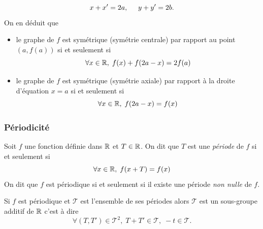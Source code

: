 \begin{displaymath}
 x + x' = 2a, \hspace{0.5cm} y + y' = 2b.
\end{displaymath}
On en déduit que 
\begin{itemize}
 \item le graphe de $f$ est symétrique (symétrie centrale) par rapport au point $(a,f(a))$ si et seulement si 
\begin{displaymath}
\forall x \in \mathbb{R}, \; f(x) + f(2a-x) = 2f(a) 
\end{displaymath}
 \item le graphe de $f$ est symétrique (symétrie axiale) par rapport à la droite d'équation $x = a$ si et seulement si 
\begin{displaymath}
\forall x \in \mathbb{R}, \; f(2a-x) = f(x) 
\end{displaymath}
\end{itemize}

\subsubsection{Périodicité}
\begin{defi}
Soit $f$ une fonction définie dans $\mathbb{R}$ et $T\in \mathbb{R}$. On dit que $T$ est une \emph{période} de $f$ si et seulement si 
\begin{displaymath}
 \forall x\in \mathbb{R}, \; f(x+T) = f(x)
\end{displaymath}
On dit que $f$ est périodique si et seulement si il existe une période \emph{non nulle} de $f$. 
\end{defi}
\begin{rem}
 Si $f$ est périodique et $\mathcal{T}$ est l'ensemble de ses périodes alors $\mathcal{T}$ est un sous-groupe additif de $\mathbb{R}$ c'est à dire
\begin{displaymath}
 \forall (T,T')\in \mathcal{T}^2, \; T+T' \in \mathcal{T},\; -t\in \mathcal{T}.
\end{displaymath}
\end{rem}

